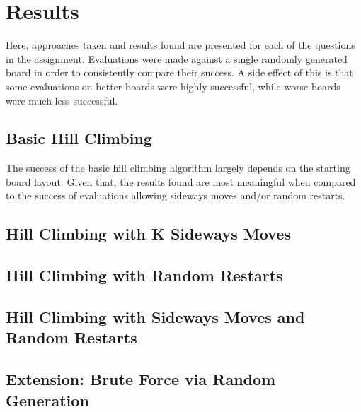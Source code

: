 \section{Results}
\label{section:results}
Here, approaches taken and results found are presented for each of the questions in the assignment. Evaluations were
made against a single randomly generated board in order to consistently compare their success. A side effect of this
is that some evaluations on better boards were highly successful, while worse boards were much less successful.

\subsection{Basic Hill Climbing}
The success of the basic hill climbing algorithm largely depends on the starting board layout. Given that, the results
found are most meaningful when compared to the success of evaluations allowing sideways moves and/or random restarts.

\subsection{Hill Climbing with K Sideways Moves}


\subsection{Hill Climbing with Random Restarts}


\subsection{Hill Climbing with Sideways Moves and Random Restarts}


\subsection{Extension: Brute Force via Random Generation}


